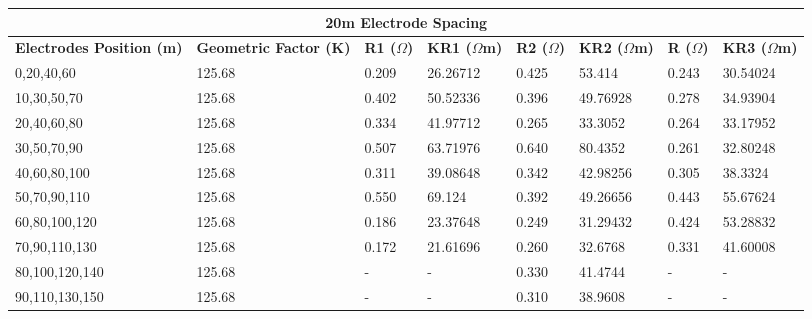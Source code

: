 \documentclass[12pt,a4paper]{report}
\begin{document}
\begin{table}[H]
    \centering
    \begin{adjustbox}{max width=\textwidth}
    \setlength{\tabcolsep}{15pt}
    \renewcommand{\arraystretch}{1.5}
    \begin{tabular}{|p{3.5cm}|p{2.5cm}|p{1.8cm}|p{2.2cm}|p{1.8cm}|p{2.2cm}|p{1.8cm}|p{2.2cm}|}
    \hline
    \multicolumn{8}{|c|}{\rule{0pt}{3em}\huge\textbf{20m Electrode Spacing}} \\ [0.5cm]
    \hline
    \textbf{Electrodes Position (m)} & \textbf{Geometric Factor (K)} & \textbf{R1 ($\Omega$)} & \textbf{KR1 ($\Omega$m)} & \textbf{R2 ($\Omega$)} & \textbf{KR2 ($\Omega$m)} & \textbf{R ($\Omega$)} & \textbf{KR3 ($\Omega$m)} \\ \hline
    0,20,40,60 & 125.68 & 0.209 & 26.26712 & 0.425 & 53.414 & 0.243 & 30.54024 \\ \hline
    10,30,50,70 & 125.68 & 0.402 & 50.52336 & 0.396 & 49.76928 & 0.278 & 34.93904 \\ \hline
    20,40,60,80 & 125.68 & 0.334 & 41.97712 & 0.265 & 33.3052 & 0.264 & 33.17952 \\ \hline
    30,50,70,90 & 125.68 & 0.507 & 63.71976 & 0.640 & 80.4352 & 0.261 & 32.80248 \\ \hline
    40,60,80,100 & 125.68 & 0.311 & 39.08648 & 0.342 & 42.98256 & 0.305 & 38.3324 \\ \hline
    50,70,90,110 & 125.68 & 0.550 & 69.124 & 0.392 & 49.26656 & 0.443 & 55.67624 \\ \hline
    60,80,100,120 & 125.68 & 0.186 & 23.37648 & 0.249 & 31.29432 & 0.424 & 53.28832 \\ \hline
    70,90,110,130 & 125.68 & 0.172 & 21.61696 & 0.260 & 32.6768 & 0.331 & 41.60008 \\ \hline
    80,100,120,140 & 125.68 & - & - & 0.330 & 41.4744 & - & - \\ \hline
    90,110,130,150 & 125.68 & - & - & 0.310 & 38.9608 & - & - \\ \hline
    \end{tabular}
\end{adjustbox}
\end{table}
\end{document}
